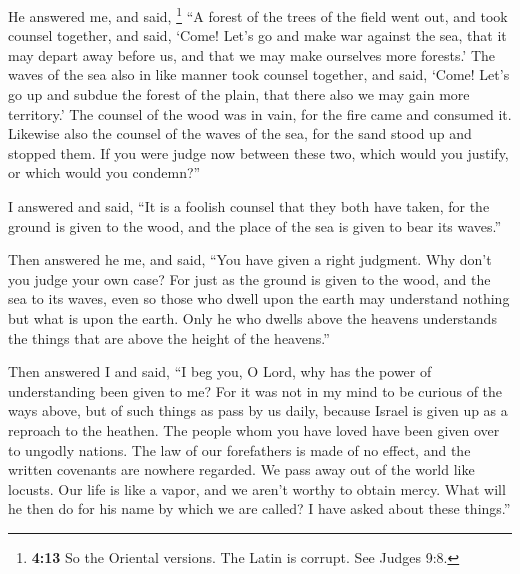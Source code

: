  He answered me, and said, \footnote{\textbf{4:13} So the
  Oriental versions. The Latin is corrupt. See Judges 9:8.} ``A forest
of the trees of the field went out, and took counsel together,
 and said, `Come! Let's go and make war against the sea,
that it may depart away before us, and that we may make ourselves more
forests.'  The waves of the sea also in like manner took
counsel together, and said, `Come! Let's go up and subdue the forest of
the plain, that there also we may gain more territory.' 
The counsel of the wood was in vain, for the fire came and consumed it.
 Likewise also the counsel of the waves of the sea, for
the sand stood up and stopped them.  If you were judge
now between these two, which would you justify, or which would you
condemn?''

 I answered and said, ``It is a foolish counsel that they
both have taken, for the ground is given to the wood, and the place of
the sea is given to bear its waves.''

 Then answered he me, and said, ``You have given a right
judgment. Why don't you judge your own case?  For just as
the ground is given to the wood, and the sea to its waves, even so those
who dwell upon the earth may understand nothing but what is upon the
earth. Only he who dwells above the heavens understands the things that
are above the height of the heavens.''

 Then answered I and said, ``I beg you, O Lord, why has
the power of understanding been given to me?  For it was
not in my mind to be curious of the ways above, but of such things as
pass by us daily, because Israel is given up as a reproach to the
heathen. The people whom you have loved have been given over to ungodly
nations. The law of our forefathers is made of no effect, and the
written covenants are nowhere regarded.  We pass away out
of the world like locusts. Our life is like a vapor, and we aren't
worthy to obtain mercy.  What will he then do for his
name by which we are called? I have asked about these things.''

